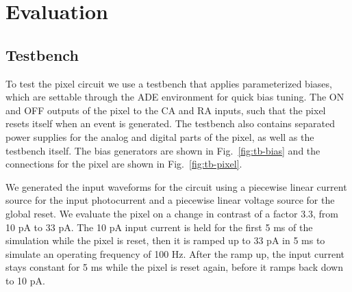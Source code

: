 \section{Evaluation}
\subsection{Testbench}
To test the pixel circuit we use a testbench that applies parameterized biases, which are settable through the ADE
environment for quick bias tuning. The ON and OFF outputs of the pixel to the CA and
RA inputs, such that the pixel resets itself when an event is generated. The testbench also contains separated power
supplies for the analog and digital parts of the pixel, as well as the testbench itself. 
The bias generators are shown in Fig.~\ref{fig:tb-bias} and the connections for the pixel are shown in Fig.~\ref{fig:tb-pixel}.

We generated the input waveforms for the circuit using a piecewise linear current source for the input photocurrent
and a piecewise linear voltage source for the global reset. We evaluate the pixel on a change in contrast of a 
factor 3.3, from 10 pA to 33 pA. The 10 pA input current is held for the first 5 ms of the simulation while the pixel is reset,
then it is ramped up to 33 pA in 5 ms to simulate an operating frequency of 100 Hz. After the ramp up, the 
input current stays constant for 5 ms while the pixel is reset again, before it ramps back down to 10 pA.

